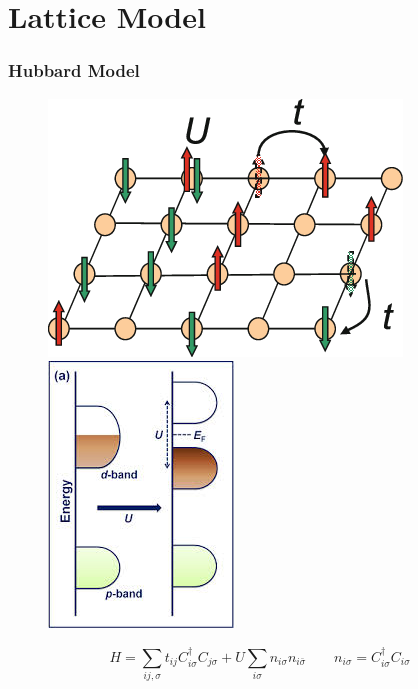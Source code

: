 \documentclass{beamer}
\begin{document}
\section{Lattice Model}
\begin{frame}
\frametitle{Hubbard Model}
\begin{figure}
\centering
\includegraphics[scale=0.5]{pic/p13.png}
\includegraphics[scale=0.5]{pic/p14.jpg}
\end{figure}
\begin{equation}
H=\sum_{ij,\sigma}t_{ij}C^\dagger_{i\sigma}C_{j\sigma}+U\sum_{i\sigma}n_{i\sigma}n_{i\bar{\sigma}}\qquad n_{i\sigma}=C^\dagger_{i\sigma}C_{i\sigma}
\end{equation}
\end{frame}
\end{document}

